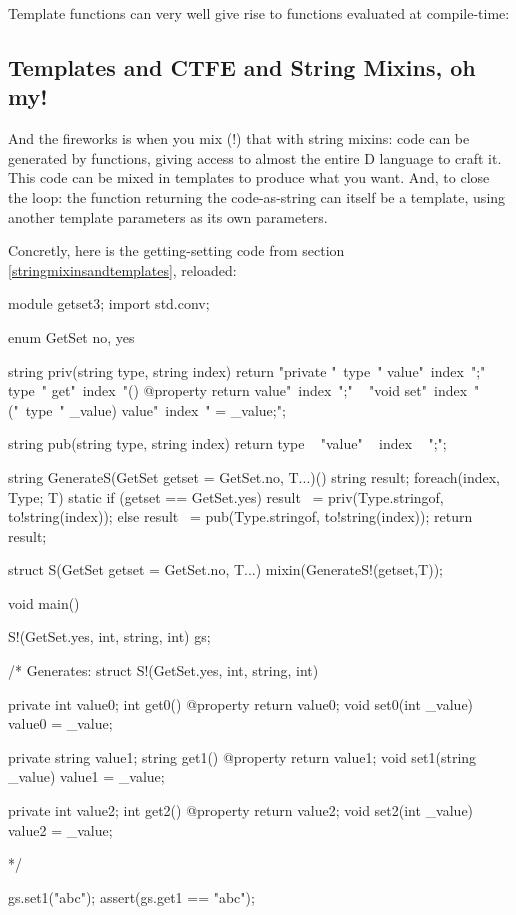 Template functions can very well give rise to functions evaluated at compile-time:

\begin{dcode}
\end{dcode}

\subsection{Templates and CTFE and String Mixins, oh my!}
\label{templatesandctfeandstringmixins}

And the fireworks is when you mix (!) that with string mixins: code can be generated by functions, giving access to almost the entire D language to craft it. This code can be mixed in templates to produce what you want. And, to close the loop: the function returning the code-as-string can itself be a template, using another template parameters as its own parameters.

Concretly, here is the getting-setting code from section \ref{stringmixinsandtemplates}, reloaded:

\begin{dcode}
module getset3;
import std.conv;

enum GetSet { no, yes}

string priv(string type, string index)
{
    return 
    "private "~type~" value"~index~";\n"
  ~ type~" get"~index~"() @property { return value"~index~";}\n"
  ~ "void set"~index~"("~type~" _value) { value"~index~" = _value;}";
}   

string pub(string type, string index)
{
    return type ~ "value" ~ index ~ ";";
}

string GenerateS(GetSet getset = GetSet.no, T...)()
{
    string result;    
    foreach(index, Type; T)
        static if (getset == GetSet.yes)
		     result ~= priv(Type.stringof, to!string(index));
        else
            result ~= pub(Type.stringof, to!string(index));
    return result;
}

struct S(GetSet getset = GetSet.no, T...)
{
    mixin(GenerateS!(getset,T));
}

void main()
{
    S!(GetSet.yes, int, string, int) gs;

/* Generates:
struct S!(GetSet.yes, int, string, int)
{
    private int value0;
    int get0() @property { return value0;}
    void set0(int _value) { value0 = _value;}

    private string value1;
    string get1() @property { return value1;}
    void set1(string _value) { value1 = _value;}

    private int value2;
    int get2() @property { return value2;}
    void set2(int _value) { value2 = _value;}
}
*/

    gs.set1("abc");
    assert(gs.get1 == "abc");
}
\end{dcode}

